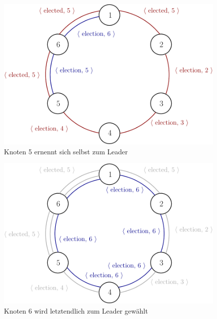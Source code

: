 \begin{figure}
  \begin{center}
    \includegraphics{pics/9_1_2.pdf}
  \end{center}
  \caption{Knoten 5 ernennt sich selbst zum Leader}
  \label{fig:9_1_firstleader}
\end{figure}

\begin{figure}
  \begin{center}
    \includegraphics{pics/9_1_3.pdf}
  \end{center}
  \caption{Knoten 6 wird letztendlich zum Leader gewählt}
  \label{fig:9_1_final}
\end{figure}
